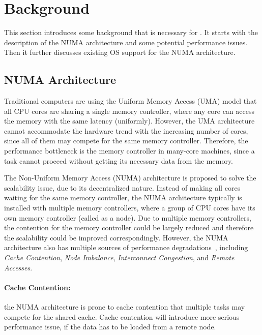 \section{Background}
\label{sec:overview}

This section introduces some background that is necessary for \NM{}. It starts with the description of the NUMA architecture and some potential performance issues. Then it further discusses existing OS support for the NUMA architecture.  

\subsection{NUMA Architecture}

\label{sec:numa}

Traditional computers are using the Uniform Memory Access (UMA) model that all CPU cores are sharing a single memory controller, where any core can access the memory with the same latency (uniformly). However, the UMA architecture cannot accommodate the hardware trend with the increasing number of cores, since all of them may compete for the same memory controller. Therefore, the performance bottleneck is the memory controller in many-core machines, since a task cannot proceed without getting its necessary data from the memory. 

The Non-Uniform Memory Access (NUMA) architecture is proposed to solve the scalability issue, due to its decentralized nature. Instead of making all cores waiting for the same memory controller, the NUMA architecture typically is installed with multiple memory controllers, where a group of CPU cores have its own memory controller (called as a node). Due to multiple memory controllers, the contention for the memory controller could be largely reduced and therefore the scalability could be improved correspondingly. However, the NUMA architecture also has multiple sources of performance degradations~\cite{Blagodurov:2011:CNC:2002181.2002182}, including \textit{Cache Contention}, \textit{Node Imbalance}, \textit{Interconnect Congestion}, and \textit{Remote Accesses}. 

\paragraph{Cache Contention:} the NUMA architecture is prone to cache contention that multiple tasks may compete for the shared cache. Cache contention will introduce more serious performance issue, if the data has to be loaded from a remote node. 
 
